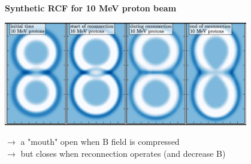 \documentclass[landscape]{slides}
\begin{document}
\begin{slide}
{\large \textbf{Synthetic RCF for 10 MeV proton beam}}

\begin{center}
\includegraphics[width=0.8\textwidth]{rcf2D.png}
\end{center}

$\to$ a "mouth" open when B field is compressed\\
$\to$ but closes when reconnection operates (and decrease B)\\

\end{slide}
\end{document}

